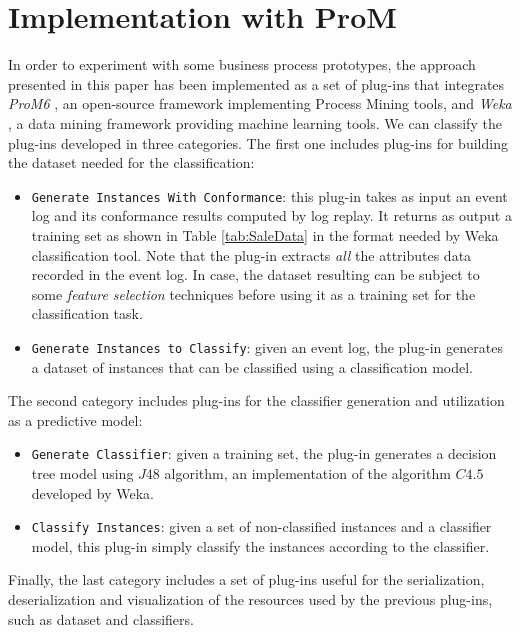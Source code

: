 \documentclass{llncs}
\begin{document}
\section{Implementation with ProM}\label{implementation}
In order to experiment with some business process prototypes, the approach presented in this paper has been implemented as a set of plug-ins that integrates \emph{ProM6} \cite{6}, an open-source framework implementing Process Mining tools, and \emph{Weka} \cite{7}, a data mining framework providing machine learning tools.
We can classify the plug-ins developed in three categories. The first one includes plug-ins for building the dataset needed for the classification:
\begin{itemize}
\item \texttt{Generate Instances With Conformance}: this plug-in takes as input an event log and its conformance results computed by log replay. It returns as output a training set as shown in Table \ref{tab:SaleData} in the format needed by Weka classification tool. Note that the plug-in extracts \emph{all} the attributes data recorded in the event log. In case, the dataset resulting can be subject to some \emph{feature selection} techniques before using it as a training set for the classification task.  

\item \texttt{Generate Instances to Classify}: given an event log, the plug-in generates a dataset of instances that can be classified using a classification model.
\end{itemize}
The second category includes plug-ins for the classifier generation and utilization as a predictive model:
\begin{itemize}
\item \texttt{Generate Classifier}: given a training set, the plug-in generates a decision tree model using $J48$ algorithm, an implementation of the algorithm $C4.5$ developed by Weka.
\item \texttt{Classify Instances}: given a set of non-classified instances and a classifier model, this plug-in simply classify the instances according to the classifier.
\end{itemize}
Finally, the last category includes a set of plug-ins useful for the serialization, deserialization and visualization of the resources used by the previous plug-ins, such as dataset and classifiers. 
\end{document}
